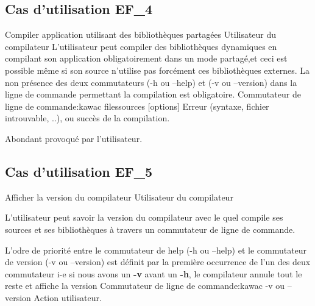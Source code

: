 \subsection{Cas d'utilisation EF\_4}
\fiche
{Compiler application utilisant des bibliothèques partagées}                      %
{Utilisateur du compilateur}                               %
{                                                %
    L'utilisateur peut compiler des bibliothèques dynamiques en compilant son application obligatoirement dans un mode partagé,et ceci est possible même si son source n'utilise pas forcément ces bibliothèques externes.      
}
{
  La non présence des deux commutateurs (-h ou --help) et (-v ou --version) dans la ligne de commande permettant la compilation est obligatoire.
}                                                %
{Commutateur de ligne de commande:kawac filessources [options] }                             %
{Erreur (syntaxe, fichier introuvable, ..), ou 
 succès de la compilation.}                       %
{                                                %
 
}{} %
{Abondant provoqué par l'utilisateur.} %
\subsection{Cas d'utilisation EF\_5}
\fiche
{Afficher la version du compilateur}                      %
{Utilisateur du compilateur}                               %
{                                                %
   
L'utilisateur peut savoir la version du compilateur avec le quel compile ses sources et ses bibliothèques  à travers un commutateur de ligne de commande.   
}
{
   L'odre de priorité entre le commutateur de help (-h ou --help) et le commutateur de version (-v ou --version) est définit par la première occurrence de l'un des deux commutateur i-e si nous avons un \textbf {-v} avant un \textbf {-h}, le compilateur annule tout le reste et affiche la version
}                                                %
{Commutateur de ligne de commande:kawac -v ou --version}                             %
{Action utilisateur.}                       %
{                                                %
 
}{} %
{} %
